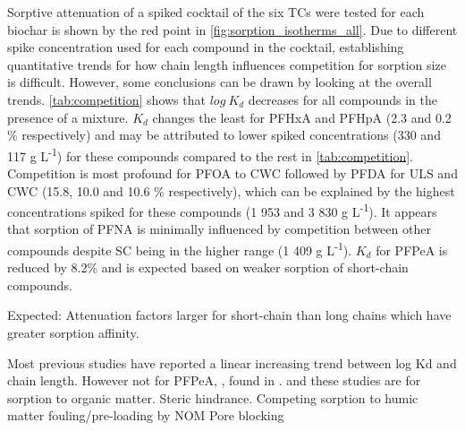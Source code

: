 Sorptive attenuation of a spiked cocktail of the six TCs were tested for each biochar is shown by the red point in \cref{fig:sorption_isotherms_all}. Due to different spike concentration used for each compound in the cocktail, establishing quantitative trends for how chain length influences competition for sorption size is difficult. However, some conclusions can be drawn by looking at the overall trends. \cref{tab:competition} shows that $log~K_d$ decreases for all compounds in the presence of a mixture. $K_d$ changes the least for PFHxA and PFHpA (2.3 and 0.2 \% respectively) and may be attributed to lower spiked concentrations (330 and 117 \textmu g L\textsuperscript{-1}) for these compounds compared to the rest in \cref{tab:competition}. Competition is most profound for PFOA to CWC followed by PFDA for ULS and CWC (15.8, 10.0 and 10.6 \% respectively), which can be explained by the highest concentrations spiked for these compounds (1 953 and 3 830 \textmu g L\textsuperscript{-1}). It appears that sorption of PFNA is minimally influenced by competition between other compounds despite SC being in the higher range (1 409 \textmu g L\textsuperscript{-1}). $K_d$ for PFPeA is reduced by 8.2\% and is expected based on weaker sorption of short-chain compounds.

Expected: Attenuation factors larger for short-chain than long chains which have greater sorption affinity.

Most previous studies have reported a linear increasing trend between log Kd and chain length. However not for PFPeA, \citep{zhang2013sorption}, found in \citep{Sorengard2019}. and \citep{guelfo2013}  these studies are for sorption to organic matter.  Steric hindrance. Competing sorption to humic matter
fouling/pre-loading by NOM
Pore blocking

